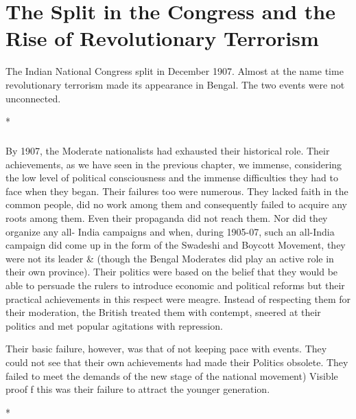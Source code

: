 \chapter[Split in the Congress and Revolutionary Terrorism]{The Split in the Congress and the Rise of Revolutionary Terrorism}


The Indian National Congress split in December 1907. Almost at the name time revolutionary terrorism made its appearance in Bengal. The two events were not unconnected.

\begin{center}*\end{center}

\paragraph*{}


By 1907, the Moderate nationalists had exhausted their historical role. Their achievements, as we have seen in the previous chapter, we immense, considering the low level of political consciousness and the immense difficulties they had to face when they began. Their failures too were numerous. They lacked faith in the common people, did no work among them and consequently failed to acquire any roots among them. Even their propaganda did not reach them. Nor did they organize any all- India campaigns and when, during 1905-07, such an all-India campaign did come up in the form of the Swadeshi and Boycott Movement, they were not its leader \& (though the Bengal Moderates did play an active role in their own province). Their politics were based on the belief that they would be able to persuade the rulers to introduce economic and political reforms but their practical achievements in this respect were meagre. Instead of respecting them for their moderation, the British treated them with contempt, sneered at their politics and met popular agitations with repression.

Their basic failure, however, was that of not keeping pace with events. They could not see that their own achievements had made their Politics obsolete. They failed to meet the demands of the new stage of the national movement) Visible proof f this was their failure to attract the younger generation.

\begin{center}*\end{center}

\paragraph*{}


